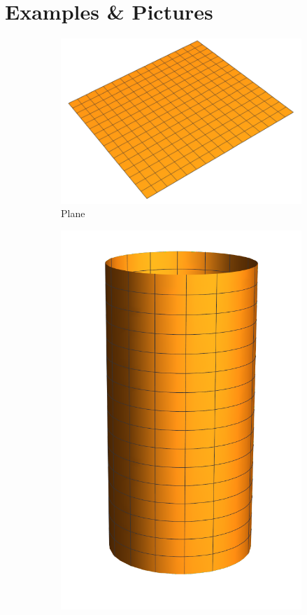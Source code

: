 \section*{Examples \& Pictures}
\begin{figure}[htp]
\centering
\begin{subfigure}{0.3\textwidth}
    \centering
    \includegraphics[width=\textwidth]{picture/week4/plane.pdf}
    \caption{Plane}
\end{subfigure}
\begin{subfigure}{0.2\textwidth}
    \centering
    \includegraphics[width=\textwidth]{picture/week4/cylinder.pdf}

\end{subfigure}
\end{figure}
